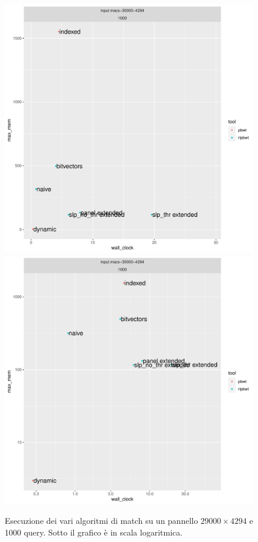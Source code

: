 \begin{figure}
  \centering
  \includegraphics[scale = 0.5]{img/time_vs_mem_1000.pdf}
  \includegraphics[scale = 0.5]{img/time_vs_mem-loglog_1000.pdf}
  \caption{Esecuzione dei vari algoritmi di match su un pannello
    $29000\times 4294$ e 1000 query. Sotto il grafico è in scala
    logaritmica. }
  \label{fig:1000}
\end{figure}

